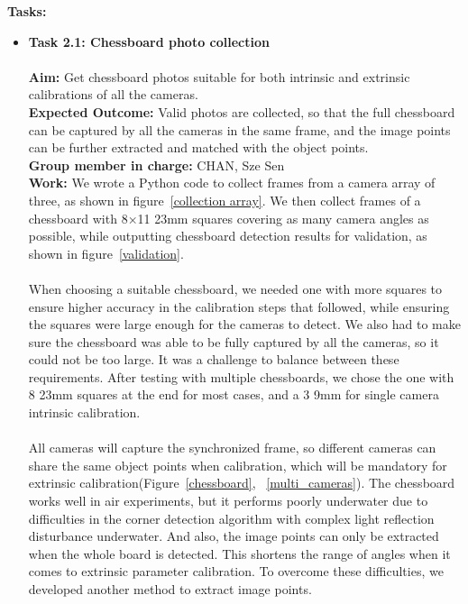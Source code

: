 \documentclass[11pt]{article}
\begin{document}
        \textbf{Tasks:}
        \begin{itemize}
            \item \textbf{Task 2.1: Chessboard photo collection}\\\\
                \textbf{Aim:} Get chessboard photos suitable for both intrinsic and extrinsic calibrations of all the cameras.\\
                \textbf{Expected Outcome:} Valid photos are collected, so that the full chessboard can be captured by all the cameras in the same frame, and the image points can be further extracted and matched with the object points.\\
                \textbf{Group member in charge:} CHAN, Sze Sen\\
                \textbf{Work:} We wrote a Python code to collect frames from a camera array of three, as shown in figure~\ref{collection array}. We then collect frames of a chessboard with 8×11 23mm squares covering as many camera angles as possible, while outputting chessboard detection results for validation, as shown in figure~\ref{validation}.\\\\
                When choosing a suitable chessboard, we needed one with more squares to ensure higher accuracy in the calibration steps that followed, while ensuring the squares were large enough for the cameras to detect. We also had to make sure the chessboard was able to be fully captured by all the cameras, so it could not be too large. It was a challenge to balance between these requirements. After testing with multiple chessboards, we chose the one with 8 23mm squares at the end for most cases, and a 3 9mm for single camera intrinsic calibration.\\\\
                All cameras will capture the synchronized frame, so different cameras can share the same object points when calibration, which will be mandatory for extrinsic calibration(Figure~\ref {chessboard}, ~\ref{multi_cameras}). The chessboard works well in air experiments, but it performs poorly underwater due to difficulties in the corner detection algorithm with complex light reflection disturbance underwater. And also, the image points can only be extracted when the whole board is detected. This shortens the range of angles when it comes to extrinsic parameter calibration. To overcome these difficulties, we developed another method to extract image points.
                \begin{figure}

\end{figure}
\end{itemize}
\end{document}
